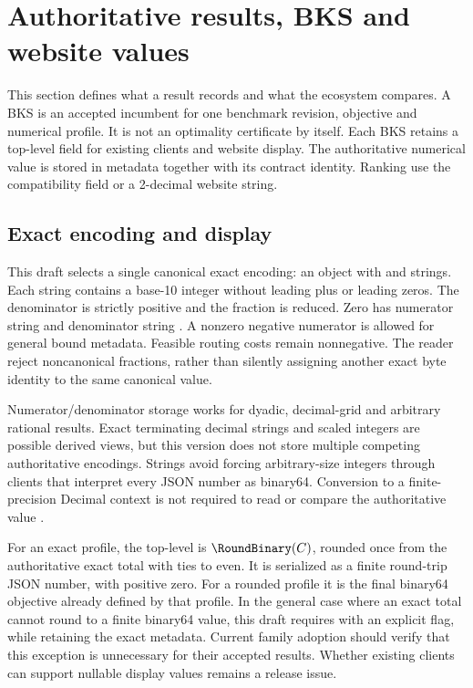 \section{Authoritative results, BKS and website values}\label{sec:results}
This section defines what a result records and what the ecosystem compares. A BKS is an accepted incumbent for one benchmark revision, objective and numerical profile. It is not an optimality certificate by itself. Each BKS retains a top-level  field for existing clients and website display. The authoritative numerical value is stored in metadata together with its contract identity. Ranking \mustnot{} use the compatibility  field or a 2-decimal website string.

\subsection{Exact encoding and display}
This draft selects a single canonical exact encoding: an object with  and  strings. Each string contains a base-10 integer without leading plus or leading zeros. The denominator is strictly positive and the fraction is reduced. Zero has numerator string  and denominator string . A nonzero negative numerator is allowed for general bound metadata. Feasible routing costs remain nonnegative. The reader \must{} reject noncanonical fractions, rather than silently assigning another exact byte identity to the same canonical value.

Numerator/denominator storage works for dyadic, decimal-grid and arbitrary rational results. Exact terminating decimal strings and scaled integers are possible derived views, but this version does not store multiple competing authoritative encodings. Strings avoid forcing arbitrary-size integers through clients that interpret every JSON number as binary64. Conversion to a finite-precision Decimal context is not required to read or compare the authoritative value \autocite{brayJSON2017,pythonFractions2026}.

For an exact profile, the top-level  is $\RoundBinary(C)$, rounded once from the authoritative exact total with ties to even. It is serialized as a finite round-trip JSON number, with positive zero. For a rounded profile it is the final binary64 objective already defined by that profile. In the general case where an exact total cannot round to a finite binary64 value, this draft requires  with an explicit  flag, while retaining the exact metadata. Current family adoption should verify that this exception is unnecessary for their accepted results. Whether existing clients can support nullable display values remains a release issue.


